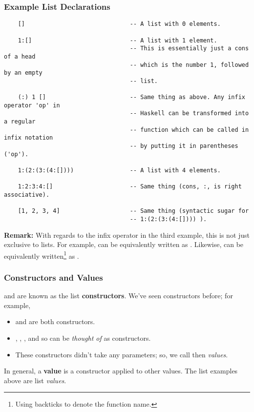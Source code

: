\documentclass[letterpaper]{article}
\begin{document}
\subsubsection{Example List Declarations}
\begin{verbatim}
    []                              -- A list with 0 elements. 

    1:[]                            -- A list with 1 element. 
                                    -- This is essentially just a cons of a head 
                                    -- which is the number 1, followed by an empty 
                                    -- list.

    (:) 1 []                        -- Same thing as above. Any infix operator 'op' in 
                                    -- Haskell can be transformed into a regular 
                                    -- function which can be called in infix notation
                                    -- by putting it in parentheses ('op'). 

    1:(2:(3:(4:[])))                -- A list with 4 elements. 

    1:2:3:4:[]                      -- Same thing (cons, :, is right associative).

    [1, 2, 3, 4]                    -- Same thing (syntactic sugar for 
                                    -- 1:(2:(3:(4:[]))) ).
\end{verbatim}
\textbf{Remark:} With regards to the infix operator in the third example, this is not just exclusive to lists. For example,  can be equivalently written as . Likewise,  can be equivalently written\footnote{Using backticks to denote the function name.} as .

\subsubsection{Constructors and Values}
\code{[]} and \code{(:)} are known as the list \textbf{constructors}. We've seen constructors before; for example, 
\begin{itemize}
    \item {} and  are both  constructors. 
    \item {}, , , and so can be \emph{thought of} as  constructors.
    \item These constructors didn't take any parameters; so, we call then \emph{values}.
\end{itemize}
In general, a \textbf{value} is a constructor applied to other values. The list examples above are list \emph{values}. 
\end{document}
